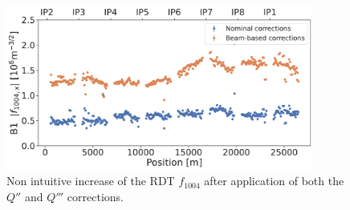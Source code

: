 \begin{figure}[H]
    \centering
    \includegraphics[width=0.9\textwidth]{./images/f1004_dq2_dq3_2022.pdf}    
    \caption{Non intuitive increase of the RDT $f_{1004}$ after application of both the $Q''$ and
    $Q'''$ corrections.}
    \label{fig:decapoles:f1004_dq2_dq3}
\end{figure}

%
%


\subsubsection{}

